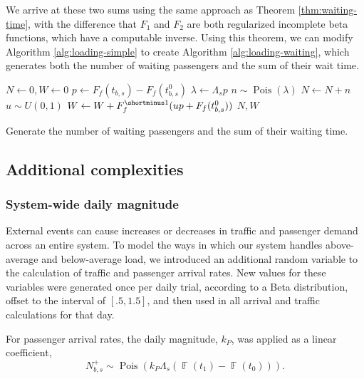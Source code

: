 \documentclass[12pt]{article}
\theoremstyle{definition}
\DeclareMathOperator{\Pois}{Pois}
\DeclareMathOperator{\F}{\mathbb F}
\newcommand{\inv}[1]{#1^{\shortminus 1}}
\begin{document}
We arrive at these two sums using the same approach as Theorem
\ref{thm:waiting-time}, with the difference that $F_1$ and $F_2$ are both
regularized incomplete beta functions, which have a computable inverse. Using
this theorem, we can modify Algorithm \ref{alg:loading-simple} to create
Algorithm \ref{alg:loading-waiting}, which generates both the number of waiting
passengers and the sum of their wait time.

\begin{algorithm}
    \begin{algorithmic}
        \State $N \gets 0, W \gets 0$
        \State $p \gets F_f(t_{b,s}) - F_f(t^0_{b,s})$
        \State $\lambda \gets \Lambda_s p$
        \State \Generate $n \sim \Pois(\lambda)$
        \State $N \gets N + n$
        \State \Generate $u \sim U(0,1)$
        \State $W \gets W + \inv {F_f}(up + F_f(t^0_{b,s}))$
        \EndFor
        \EndFor
        \State \Return $N, W$
        \EndFunction
    \end{algorithmic}
    \caption{Generate the number of waiting passengers and the
    sum of their waiting time.}
    \label{alg:loading-waiting}
\end{algorithm}

\subsection{Additional complexities}

\subsubsection{System-wide daily magnitude}

External events can cause increases or decreases in traffic and passenger
demand across an entire system. To model the ways in which our system handles
above-average and below-average load, we introduced an additional random
variable to the calculation of traffic and passenger arrival rates. New values
for these variables were generated once per daily trial, according to a Beta
distribution, offset to the interval of $[.5, 1.5]$, and then used in all
arrival and traffic calculations for that day.

For passenger arrival rates, the daily magnitude, $k_P$, was applied as a
linear coefficient,
\[
    N^+_{b,s} \sim \Pois(k_P \Lambda_s
    \left(\F(t_1) - \F(t_0)\right)).
\]
\end{document}
